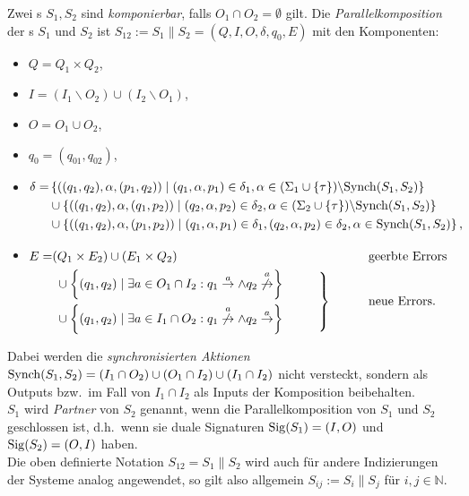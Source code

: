 \begin{Def}[Parallelkomposition]
\label{DefParallelkomposition}
  Zwei \EIO{}s $S_1, S_2$ sind \emph{komponierbar}, falls
  $O_1\cap O_2=\emptyset$ gilt. Die \emph{Parallelkomposition} der \EIO{}s
  $S_1$ und $S_2$ ist
  $S_{12}:=S_1\|S_2=(Q,I,O,\delta ,q_0,E)$ mit den Komponenten:
  \begin{itemize}
    \item $Q=Q_1\times Q_2$,
    \item $I=(I_1\backslash O_2)\cup(I_2\backslash O_1)$,
    \item $O=O_1\cup O_2$,
    \item $q_0=(q_{01},q_{02})$,
    \item $\begin{aligned}[t]
    \delta =&\left\{((q_1,q_2),\alpha ,(p_1,q_2))\mid (q_1,\alpha ,p_1)\in\delta
      _1,\alpha\in(\Sigma _1\cup\{\tau\})\backslash \mathrm{Synch}(S_1,S_2)\right\}\\
      &\cup\left\{((q_1,q_2),\alpha ,(q_1,p_2))\mid (q_2,\alpha ,p_2)\in\delta
      _2,\alpha\in(\Sigma _2\cup\{\tau\})\backslash \mathrm{Synch}(S_1,S_2)\right\}\\
      &\cup\left\{((q_1,q_2),\alpha ,(p_1,p_2))\mid (q_1,\alpha ,p_1)\in\delta
      _1, (q_2,\alpha ,p_2)\in\delta _2, \alpha\in \mathrm{Synch}(S_1,S_2)\right\},
  \end{aligned}$
    \item $\begin{aligned}[t]
        E=&(Q_1\times E_2)\cup (E_1\times Q_2)
        &&\phantom{neue}\mathrm{geerbte}~\mathrm{Errors}\\
        &\left.\begin{aligned}
        &\cup\left\{(q_1,q_2)\mid \exists a\in O_1\cap I_2: q_1\overset{a}{\rightarrow}\wedge
      q_2\overset{a}{\not{\hspace{-0.1cm}\rightarrow}}\right\}\\
      &\cup\left\{(q_1,q_2)\mid \exists a\in I_1\cap O_2:
q_1\overset{a}{\not{\hspace{-0.1cm}\rightarrow}}\wedge
q_2\overset{a}{\rightarrow}\right\}
\end{aligned}\hspace{1cm}\right\}
      &&\phantom{neue}\mathrm{neue}~\mathrm{Errors}.\\
  \end{aligned}$
  \end{itemize}
  Dabei werden die \emph{synchronisierten Aktionen} $\mathrm{Synch}(S_1,
  S_2)=(I_1\cap O_2)\cup(O_1\cap I_2)\cup (I_1\cap I_2)$ nicht versteckt,
  sondern als Outputs bzw.\ im Fall von $I_1\cap I_2$ als Inputs der
  Komposition beibehalten.\\
  $S_1$ wird \emph{Partner} von $S_2$ genannt, wenn die Parallelkomposition von
  $S_1$ und $S_2$ geschlossen ist, d.h.\ wenn sie duale Signaturen
  $\mathrm{Sig}(S_1)=(I,O)$ und $\mathrm{Sig}(S_2)=(O,I)$ haben.\\
  Die oben definierte Notation $S_{12}=S_1\|S_2$ wird auch für andere
  Indizierungen der Systeme analog angewendet, so gilt also allgemein
  $S_{ij}:=S_i\|S_j$ für $i,j\in\mathbb{N}$.
\end{Def}

